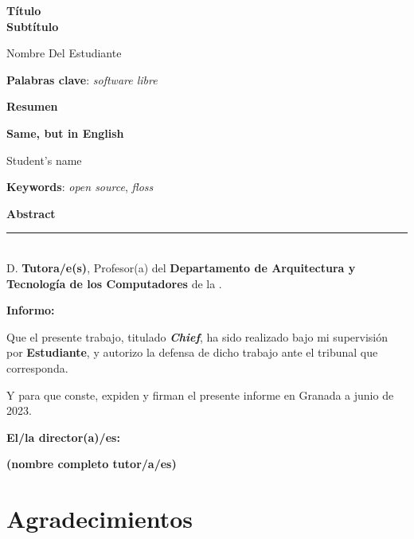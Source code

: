 \thispagestyle{empty}

\begin{center}
{\large\bfseries Título \\ Subtítulo }\\
\end{center}
\begin{center}
Nombre Del Estudiante\\
\end{center}


\vspace{0.5cm}
\noindent\textbf{Palabras clave}: \textit{software libre}
\vspace{0.7cm}

\noindent\textbf{Resumen}\\
	

\cleardoublepage

\begin{center}
	{\large\bfseries Same, but in English}\\
\end{center}
\begin{center}
	Student's name\\
\end{center}
\vspace{0.5cm}
\noindent\textbf{Keywords}: \textit{open source}, \textit{floss}
\vspace{0.7cm}

\noindent\textbf{Abstract}\


\cleardoublepage

\thispagestyle{empty}

\noindent\rule[-1ex]{\textwidth}{2pt}\\[4.5ex]

D. \textbf{Tutora/e(s)}, Profesor(a) del \textbf{Departamento de Arquitectura y Tecnología de los Computadores} de la \textbf{\universidad}.

\vspace{0.5cm}

\textbf{Informo:}

\vspace{0.5cm}

Que el presente trabajo, titulado 
\textit{\textbf{Chief}},
ha sido realizado bajo mi supervisión por \textbf{Estudiante},
 y autorizo la defensa de dicho trabajo ante el tribunal que corresponda.

\vspace{0.5cm}

Y para que conste, expiden y firman el presente informe en Granada a junio de 2023.

\vspace{1cm}

\textbf{El/la director(a)/es: }

\vspace{5cm}

\noindent \textbf{(nombre completo tutor/a/es)}

\chapter*{Agradecimientos}




